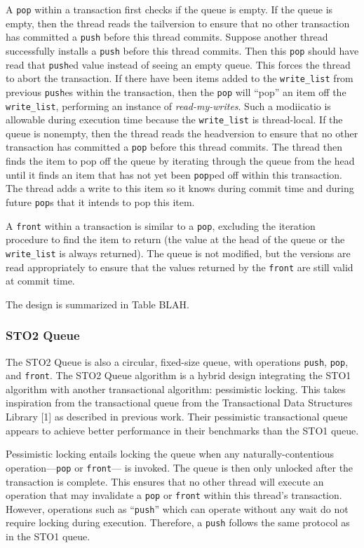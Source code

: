 A \texttt{pop} within a transaction first checks if the queue is empty. If the queue is empty, then the thread reads the tailversion to ensure that no other transaction has committed a \texttt{push} before this thread commits. Suppose another thread successfully installs a \texttt{push} before this thread commits. Then this \texttt{pop} should have read that \texttt{push}ed value instead of seeing an empty queue. This forces the thread to abort the transaction. If there have been items added to the \texttt{write\_list} from previous \texttt{push}es within the transaction, then the \texttt{pop} will “pop” an item off the \texttt{write\_list}, performing an instance of \emph{read-my-writes}. Such a modiicatio is allowable during execution time because the \texttt{write\_list} is thread-local. If the queue is nonempty, then the thread reads the headversion to ensure that no other transaction has committed a \texttt{pop} before this thread commits. The thread then finds the item to pop off the queue by iterating through the queue from the head until it finds an item that has not yet been \texttt{pop}ped off within this transaction. The thread adds a write to this item so it knows during commit time and during future \texttt{pop}s that it intends to pop this item.

A \texttt{front} within a transaction is similar to a \texttt{pop}, excluding the iteration procedure to find the item to return (the value at the head of the queue or the \texttt{write\_list} is always returned). The queue is not modified, but the versions are read appropriately to ensure that the values returned by the \texttt{front} are still valid at commit time.

The design is summarized in Table BLAH.

\subsubsection{STO2 Queue}
The STO2 Queue is also a circular, fixed-size queue, with operations \texttt{push}, \texttt{pop}, and \texttt{front}. The STO2 Queue algorithm is a hybrid design integrating the STO1 algorithm with another transactional algorithm: pessimistic locking. This takes inspiration from the transactional queue from the Transactional Data Structures Library [1] as described in previous work. Their pessimistic transactional queue appears to achieve better performance in their benchmarks than the STO1 queue. 

Pessimistic locking entails locking the queue when any naturally-contentious operation---\texttt{pop} or \texttt{front}--- is invoked. The queue is then only unlocked after the transaction is complete. This ensures that no other thread will execute an operation that may invalidate a \texttt{pop} or \texttt{front} within this thread’s transaction. However, operations such as “\texttt{push}” which can operate without any wait do not require locking during execution. Therefore, a \texttt{push} follows the same protocol as in the STO1 queue.

